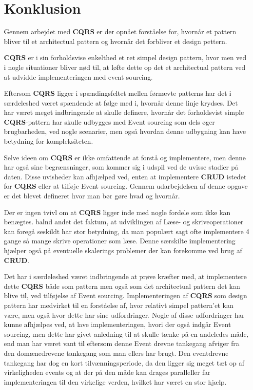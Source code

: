 \chapter{Konklusion}
Gennem arbejdet med \textbf{CQRS} er der opnået forståelse for, hvornår et pattern bliver til et architectual pattern og hvornår det forbliver et design pettern.

\textbf{CQRS} er i sin forholdsvise enkelthed et ret simpel design pattern, hvor men ved i nogle situationer bliver nød til, at løfte dette op det et architectual pattern ved at udvidde implementeringen med event sourcing.

Eftersom \textbf{CQRS} ligger i spændingsfeltet mellen førnævte patterns har det i særdeleshed været spændende at følge med i, hvornår denne linje krydses. Det har været meget indbringende at skulle definere, hvornår det forholdsvist simple \textbf{CQRS}-pattern har skulle udbygges med Event sourcing som dels øger brugbarheden, ved nogle scenarier, men også hvordan denne udbygning kan have betydning for kompleksiteten.

Selve ideen om \textbf{CQRS} er ikke omfattende at forstå og implementere, men denne har også sine begrænsninger, som kommer sig i udspil ved de uvisse stadier på daten. Disse uvisheder kan afhjælped ved, enten at implementere \textbf{CRUD} istedet for \textbf{CQRS} eller at tilføje Event sourcing. Gennem udarbejdelsen af denne opgave er det blevet defineret hvor man bør gøre hvad og hvornår. 

Der er ingen tvivl om at \textbf{CQRS} ligger inde med nogle fordele som ikke kan benægtes. balnd andet det faktum, at udviklingen af Læse- og skriveoperationer kan foregå seskildt har stor betydning, da man populært sagt ofte implementere 4 gange så mange skrive operationer som læse. Denne særskilte implementering hjælper også på eventuelle skalerings problemer der kan forekomme ved brug af \textbf{CRUD}.\newline 

Det har i særdeleshed været indbringende at prøve kræfter med, at implementere dette \textbf{CQRS} både som pattern men også som det architectual pattern det kan blive til, ved tilføjelse af Event sourcing. Implementeringen af \textbf{CQRS} som design pattern har medvirket til en forståelse af, hvor relativt simpel pattern'et kan være, men også hvor dette har sine udfordringer. Nogle af disse udfordringer har kunne afhjælpes ved, at lave implementeringen, hvori der også indgår Event sourcing, men dette har givet anledning til at skulle tænke på en andeledes måde, end man har været vant til eftersom denne Event drevne tankegang afviger fra den domænedrevene tankegang som man ellers har brugt. Den eventdrevne tankegang har dog en kort tilvænningsperiode, da den ligger sig meget tæt op af virkeligheden events og at der på den måde kan drages paralleller far implementeringen til den virkelige verden, hvilket har været en stor hjælp. 

